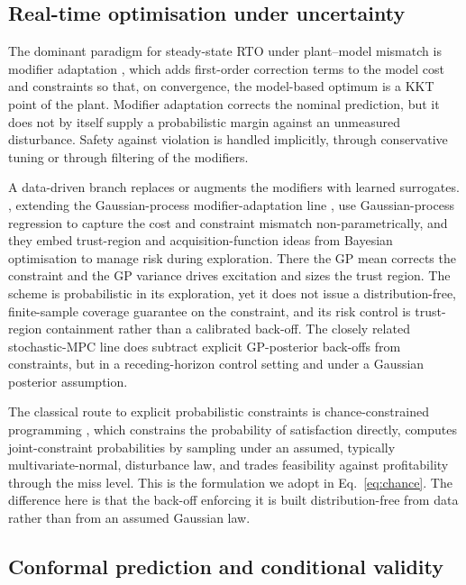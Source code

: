 \documentclass[review,times]{elsarticle}
\begin{document}
\subsection{Real-time optimisation under uncertainty}

The dominant paradigm for steady-state RTO under plant--model mismatch is modifier adaptation
\citep{marchetti2009,chachuat2009}, which adds first-order correction terms to the model cost
and constraints so that, on convergence, the model-based optimum is a KKT point of the plant.
Modifier adaptation corrects the nominal prediction, but it does not by itself supply a
probabilistic margin against an unmeasured disturbance. Safety against violation is handled
implicitly, through conservative tuning or through filtering of the modifiers.

A data-driven branch replaces or augments the modifiers with learned surrogates.
\citet{delrio2021}, extending the Gaussian-process modifier-adaptation line
\citep{delrio2019}, use Gaussian-process regression to capture the cost and constraint
mismatch non-parametrically, and they embed trust-region and acquisition-function ideas from
Bayesian optimisation to manage risk during exploration. There the GP mean corrects the
constraint and the GP variance drives excitation and sizes the trust region. The scheme is
probabilistic in its exploration, yet it does not issue a distribution-free, finite-sample
coverage guarantee on the constraint, and its risk control is trust-region containment rather
than a calibrated back-off. The closely related stochastic-MPC line
\citep{bradford2019,bradford2020} does subtract explicit GP-posterior back-offs from
constraints, but in a receding-horizon control setting and under a Gaussian posterior
assumption.

The classical route to explicit probabilistic constraints is chance-constrained programming
\citep{li2008}, which constrains the probability of satisfaction directly, computes
joint-constraint probabilities by sampling under an assumed, typically multivariate-normal,
disturbance law, and trades feasibility against profitability through the miss level. This is
the formulation we adopt in Eq.~\eqref{eq:chance}. The difference here is that the back-off
enforcing it is built distribution-free from data rather than from an assumed Gaussian law.

\subsection{Conformal prediction and conditional validity}
\end{document}
